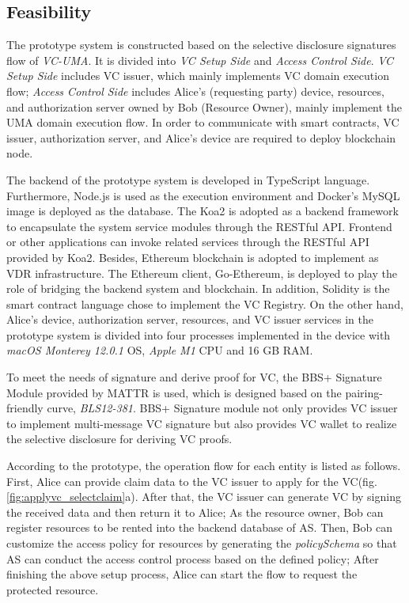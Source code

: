 \documentclass[conference, dvipdfmx]{IEEEtran} %
\begin{document}
\begin{sloppypar}
\subsection{Feasibility}
The prototype system is constructed based on the selective disclosure signatures flow of \textit{VC-UMA}.
It is divided into \textit{VC Setup Side} and \textit{Access Control Side}. \textit{VC Setup Side} includes VC issuer, which mainly implements VC domain execution flow; \textit{Access Control Side} includes Alice's (requesting party) device, resources, and authorization server owned by Bob (Resource Owner), mainly implement the UMA domain execution flow. In order to communicate with smart contracts, VC issuer, authorization server, and Alice's device are required to deploy blockchain node.

The backend of the prototype system is developed in TypeScript language. Furthermore, Node.js is used as the execution environment and Docker's MySQL image is deployed as the database. 
The Koa2 is adopted as a backend framework to encapsulate the system service modules through the RESTful API. Frontend or other applications can invoke related services through the RESTful API provided by Koa2. 
Besides, Ethereum blockchain is adopted to implement as VDR infrastructure. The Ethereum client,  Go-Ethereum\cite{geth}, is deployed to play the role of bridging the backend system and blockchain. In addition, Solidity is the smart contract language chose to implement the VC Registry. 
On the other hand, Alice's device, authorization server, resources, and VC issuer services in the prototype system is divided into four processes implemented in the device with \textit{macOS Monterey 12.0.1} OS, \textit{Apple M1} CPU and 16 GB RAM.

To meet the needs of signature and derive proof for VC, the BBS+ Signature Module\cite{bbsplus_github} provided by MATTR is used, which is designed based on the pairing-friendly curve, \textit{BLS12-381}.
BBS+ Signature module not only provides VC issuer to implement multi-message VC signature but also provides VC wallet to realize the selective disclosure for deriving VC proofs. 

According to the prototype, the operation flow for each entity is listed as follows. First, Alice can provide claim data to the VC issuer to apply for the VC(fig. \ref{fig:applyvc_selectclaim}a). 
After that, the VC issuer can generate VC by signing the received data and then return it to Alice;
As the resource owner, Bob can register resources to be rented into the backend database of AS. Then, Bob can customize the access policy for resources by generating the \textit{policySchema} so that AS can conduct the access control process based on the defined policy;
After finishing the above setup process, Alice can start the flow to request the protected resource.


\end{sloppypar}
\end{document}
